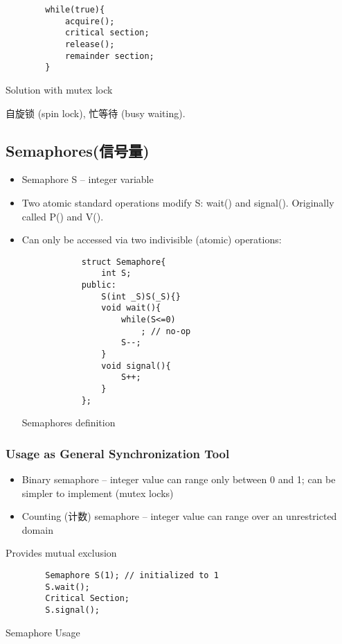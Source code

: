\begin{code}
    \begin{verbatim}
        while(true){
            acquire();
            critical section;
            release();
            remainder section;
        }
    \end{verbatim}
    \caption{Solution with mutex lock}
\end{code}

自旋锁 (spin lock), 忙等待 (busy waiting).  


\subsection{Semaphores(信号量)}
\begin{itemize}
    \item Semaphore S -- integer variable
    \item Two atomic standard operations modify S: wait() and signal(). 
    \subitem Originally called P() and V(). 
    \item Can only be accessed via two indivisible (atomic) operations:
    \begin{code}
        \begin{verbatim}
            struct Semaphore{
                int S;
            public:
                S(int _S)S(_S){}
                void wait(){
                    while(S<=0)
                        ; // no-op
                    S--;
                }
                void signal(){
                    S++;
                }
            };
        \end{verbatim}
        \caption{Semaphores definition}
    \end{code}
    
\end{itemize}

\subsubsection{Usage as General Synchronization Tool}
\begin{itemize}
    \item Binary semaphore -- integer value can range only between 0 and 1; can be simpler to implement (mutex locks)
    \item Counting (计数) semaphore -- integer value can range over an unrestricted domain
\end{itemize}

Provides mutual exclusion
\begin{code}
    \begin{verbatim}
        Semaphore S(1); // initialized to 1
        S.wait();
        Critical Section;
        S.signal();
    \end{verbatim}
    \caption{Semaphore Usage}
\end{code}


